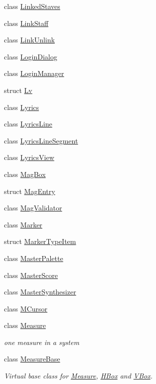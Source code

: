 \begin{DoxyCompactItemize}
class \hyperlink{class_ms_1_1_linked_staves}{Linked\+Staves}
\item 
class \hyperlink{class_ms_1_1_link_staff}{Link\+Staff}
\item 
class \hyperlink{class_ms_1_1_link_unlink}{Link\+Unlink}
\item 
class \hyperlink{class_ms_1_1_login_dialog}{Login\+Dialog}
\item 
class \hyperlink{class_ms_1_1_login_manager}{Login\+Manager}
\item 
struct \hyperlink{struct_ms_1_1_lv}{Lv}
\item 
class \hyperlink{class_ms_1_1_lyrics}{Lyrics}
\item 
class \hyperlink{class_ms_1_1_lyrics_line}{Lyrics\+Line}
\item 
class \hyperlink{class_ms_1_1_lyrics_line_segment}{Lyrics\+Line\+Segment}
\item 
class \hyperlink{class_ms_1_1_lyrics_view}{Lyrics\+View}
\item 
class \hyperlink{class_ms_1_1_mag_box}{Mag\+Box}
\item 
struct \hyperlink{struct_ms_1_1_mag_entry}{Mag\+Entry}
\item 
class \hyperlink{class_ms_1_1_mag_validator}{Mag\+Validator}
\item 
class \hyperlink{class_ms_1_1_marker}{Marker}
\item 
struct \hyperlink{struct_ms_1_1_marker_type_item}{Marker\+Type\+Item}
\item 
class \hyperlink{class_ms_1_1_master_palette}{Master\+Palette}
\item 
class \hyperlink{class_ms_1_1_master_score}{Master\+Score}
\item 
class \hyperlink{class_ms_1_1_master_synthesizer}{Master\+Synthesizer}
\item 
class \hyperlink{class_ms_1_1_m_cursor}{M\+Cursor}
\item 
class \hyperlink{class_ms_1_1_measure}{Measure}
\begin{DoxyCompactList}\small\item\em one measure in a system \end{DoxyCompactList}\item 
class \hyperlink{class_ms_1_1_measure_base}{Measure\+Base}
\begin{DoxyCompactList}\small\item\em Virtual base class for \hyperlink{class_ms_1_1_measure}{Measure}, \hyperlink{class_ms_1_1_h_box}{H\+Box} and \hyperlink{class_ms_1_1_v_box}{V\+Box}. \end{DoxyCompactList}\item 

\end{DoxyCompactItemize}
